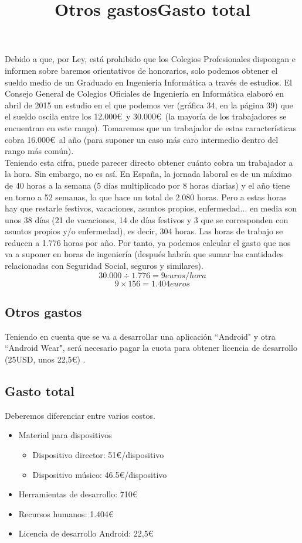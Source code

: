 Debido a que, por Ley, está prohibido que los Colegios Profesionales dispongan e informen
sobre baremos orientativos de honorarios, solo podemos obtener el sueldo medio de un Graduado
en Ingeniería Informática a través de estudios. El Consejo General de Colegios Oficiales de
Ingeniería en Informática elaboró en abril de 2015 un estudio \cite{estudioSalario} en el que
podemos ver (gráfica 34, en la página 39) que el sueldo oscila entre los 12.000\euro\ y
30.000\euro\ (la mayoría de los trabajadores se encuentran en este rango). Tomaremos que
un trabajador de estas características cobra 16.000\euro\ al año (para suponer un caso
más caro intermedio dentro del rango más común).\\

Teniendo esta cifra, puede parecer directo obtener cuánto cobra un trabajador a la hora. Sin
embargo, no es así. En España, la jornada laboral es de un máximo de 40 horas a la semana (5 días
multiplicado por 8 horas diarias) y el año tiene en torno a 52 semanas, lo que hace un total de 2.080 horas.
Pero a estas horas hay que restarle festivos, vacaciones, asuntos propios, enfermedad... en media
son unos 38 días (21 de vacaciones, 14 de días festivos y 3 que se corresponden con asuntos propios y/o
enfermedad), es decir, 304 horas. Las horas de trabajo se reducen a 1.776 horas por año. Por tanto, ya
podemos calcular el gasto que nos va a suponer en horas de ingeniería (después habría que sumar
las cantidades relacionadas con Seguridad Social, seguros y similares).\\


\[
  30.000 \div 1.776 = 9 euros/hora
\]
\[
  9 \times 156 = 1.404 euros
\]

\subsection{Otros gastos}
\title{Otros gastos}
Teniendo en cuenta que se va a desarrollar una aplicación ``Android" y otra ``Android Wear",
será necesario pagar la cuota para obtener licencia de desarrollo (25USD, unos 22,5\euro) \cite{desarrollaAndroid}.\\


\subsection{Gasto total}
\title{Gasto total}
Deberemos diferenciar entre varios costos.

  \begin{itemize}
    \item Material para dispositivos
      \begin{itemize}
        \item Dispositivo director: 51\euro/dispositivo
        \item Dispositivo músico: 46.5\euro/dispositivo
      \end{itemize}
    \item Herramientas de desarrollo: 710\euro
    \item Recursos humanos: 1.404\euro
    \item Licencia de desarrollo Android: 22,5\euro
  \end{itemize}

